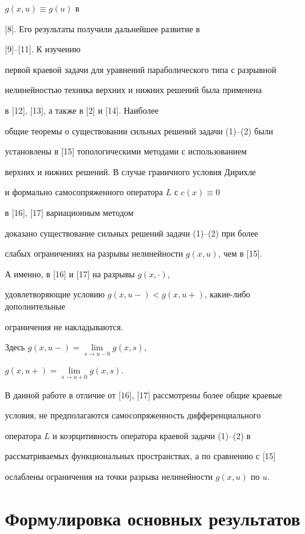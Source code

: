 $g(x,u)\equiv g(u)$ в 


[8]. Его результаты получили дальнейшее развитие в 


[9]--[11]. К изучению 


первой краевой задачи для уравнений параболического типа с разрывной 


нелинейностью техника верхних и нижних решений была применена 


в [12], [13], а также в [2] и [14]. Наиболее 


общие теоремы о существовании сильных решений задачи (1)--(2) были 


установлены в [15] топологическими методами с использованием 


верхних и нижних решений. В случае граничного условия Дирихле 


и формально самосопряженного оператора $L$ с $c(x)\equiv 0$ 


в [16], [17] вариационным методом 


доказано существование сильных решений задачи (1)--(2) при более 


слабых ограничениях на разрывы нелинейности $g(x,u)$, чем в [15]. 


А именно, в [16] и [17] на разрывы $g(x,\cdot)$, 


удовлетворяющие условию $g(x,u-)<g(x,u+)$, какие-либо дополнительные 


ограничения не накладываются. 


Здесь $g(x,u-)=\lim\limits_{s\to u-0}g(x,s)$, 


$g(x,u+)=\lim\limits_{s\to u+0}g(x,s)$. 


В данной работе в отличие от [16], [17] рассмотрены более общие краевые 


условия, не предполагаются самосопряженность дифференциального 


оператора $L$ и коэрцитивность оператора краевой задачи (1)--(2) в 


рассматриваемых функциональных пространствах, а по сравнению с [15] 


ослаблены ограничения на точки разрыва нелинейности $g(x,u)$ по $u$. 


 


\section{Формулировка основных результатов} 


